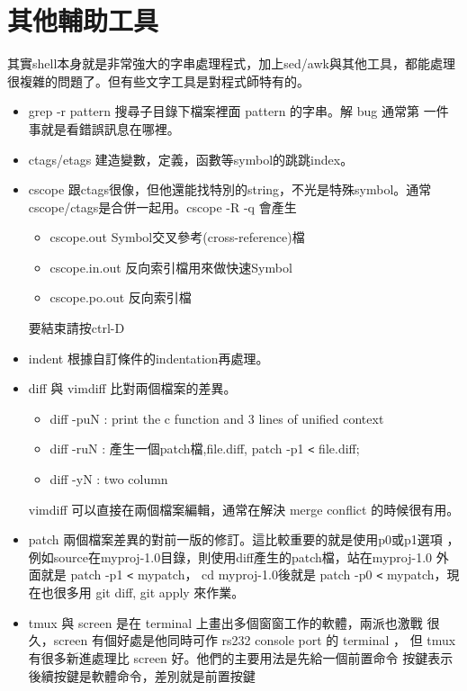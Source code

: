     \section{其他輔助工具}
    其實shell本身就是非常強大的字串處理程式，加上sed/awk與其他工具，都能處理
    很複雜的問題了。但有些文字工具是對程式師特有的。
    \begin{itemize}
      \item grep -r pattern 搜尋子目錄下檔案裡面 pattern 的字串。解 bug 通常第
        一件事就是看錯誤訊息在哪裡。
      \item ctags/etags 建造變數，定義，函數等symbol的跳跳index。
      \item cscope 跟ctags很像，但他還能找特別的string，不光是特殊symbol。通常
        cscope/ctags是合併一起用。cscope -R -q 會產生
      \begin{itemize}
        \item cscope.out      Symbol交叉參考(cross-reference)檔
        \item cscope.in.out   反向索引檔用來做快速Symbol
        \item cscope.po.out   反向索引檔
      \end{itemize}
      要結束請按ctrl-D
      \item indent 根據自訂條件的indentation再處理。
      \item diff 與 vimdiff 比對兩個檔案的差異。
        \begin{itemize}
          \item diff -puN : print the c function and 3 lines of unified context
          \item diff -ruN : 產生一個patch檔,file.diff, patch -p1 \verb=<= file.diff;
          \item diff -yN : two column
        \end{itemize}
        vimdiff 可以直接在兩個檔案編輯，通常在解決 merge conflict 的時候很有用。
      \item patch 兩個檔案差異的對前一版的修訂。這比較重要的就是使用p0或p1選項
        ，例如source在myproj-1.0目錄，則使用diff產生的patch檔，站在myproj-1.0
        外面就是 patch -p1 \verb=<= mypatch， cd myproj-1.0後就是 patch -p0 
        \verb=<= mypatch，現在也很多用 git diff, git apply 來作業。
      \item tmux 與 screen 是在 terminal 上畫出多個窗窗工作的軟體，兩派也激戰
        很久，screen 有個好處是他同時可作 rs232 console port 的 terminal ，
        但 tmux 有很多新進處理比 screen 好。他們的主要用法是先給一個前置命令
        按鍵表示後續按鍵是軟體命令，差別就是前置按鍵

\end{itemize}
